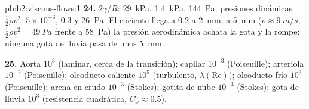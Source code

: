 \begin{solution}{pb:b2:viscous-flows:1}
\textbf{24.} $2\gamma/R$: \qty{29}{kPa}, \qty{1.4}{kPa}, \qty{144}{Pa}; presiones
dinámicas $\tfrac12\rho v^2$: $5 \times 10^{-6}$, $0.3$ y \qty{26}{Pa}. El cociente
llega a $0.2$ a \qty{2}{mm}; a \qty{5}{mm} ($v \approx \qty{9}{m/s}$, $\tfrac12\rho v^2 =
\qty{49}{Pa}$ frente a \qty{58}{Pa}) la presión aerodinámica achata la gota
y la rompe: ninguna gota de lluvia pasa de unos \qty{5}{mm}.

\textbf{25.} Aorta $10^3$ (laminar, cerca de la transición); capilar $10^{-3}$
(Poiseuille); arteriola $10^{-2}$ (Poiseuille); oleoducto caliente $10^5$
(turbulento, $\lambda(\mathrm{Re})$); oleoducto frío $10^3$ (Poiseuille); arena en
crudo $10^{-3}$ (Stokes); gotita de nube $10^{-3}$ (Stokes); gota de lluvia $10^3$
(resistencia cuadrática, $C_x \approx 0.5$).
\end{solution}
